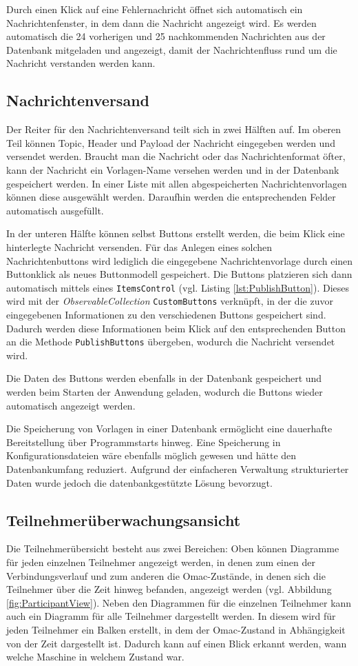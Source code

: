 Durch einen Klick auf eine Fehlernachricht öffnet sich automatisch ein Nachrichtenfenster, in dem dann die Nachricht angezeigt wird. Es werden automatisch die 24 vorherigen und 25 nachkommenden Nachrichten aus der Datenbank mitgeladen und angezeigt, damit der Nachrichtenfluss rund um die Nachricht verstanden werden kann.
\subsection{Nachrichtenversand}
Der Reiter für den Nachrichtenversand teilt sich in zwei Hälften auf. Im oberen Teil können Topic, Header und Payload der Nachricht eingegeben werden und versendet werden. Braucht man die Nachricht oder das Nachrichtenformat öfter, kann der Nachricht ein Vorlagen-Name versehen werden und in der Datenbank gespeichert werden. In einer Liste mit allen abgespeicherten Nachrichtenvorlagen können diese ausgewählt werden. Daraufhin werden die entsprechenden Felder automatisch ausgefüllt. 

In der unteren Hälfte können selbst Buttons erstellt werden, die beim Klick eine hinterlegte Nachricht versenden. Für das Anlegen eines solchen Nachrichtenbuttons wird lediglich die eingegebene Nachrichtenvorlage durch einen Buttonklick als neues Buttonmodell gespeichert. Die Buttons platzieren sich dann automatisch mittels eines \lstinline|ItemsControl| (vgl. Listing \ref{lst:PublishButton}). Dieses wird mit der \textit{ObservableCollection} \lstinline|CustomButtons| verknüpft, in der die zuvor eingegebenen Informationen zu den verschiedenen Buttons gespeichert sind. Dadurch werden diese Informationen beim Klick auf den entsprechenden Button an die Methode \lstinline|PublishButtons| übergeben, wodurch die Nachricht versendet wird.

Die Daten des Buttons werden ebenfalls in der Datenbank gespeichert und werden beim Starten der Anwendung geladen, wodurch die Buttons wieder automatisch angezeigt werden. 

Die Speicherung von Vorlagen in einer Datenbank ermöglicht eine dauerhafte Bereitstellung über Programmstarts hinweg. Eine Speicherung in Konfigurationsdateien wäre ebenfalls möglich gewesen und hätte den Datenbankumfang reduziert. Aufgrund der einfacheren Verwaltung strukturierter Daten wurde jedoch die datenbankgestützte Lösung bevorzugt.
\subsection{Teilnehmerüberwachungsansicht}
Die Teilnehmerübersicht besteht aus zwei Bereichen: Oben können Diagramme für jeden einzelnen Teilnehmer angezeigt werden, in denen zum einen der Verbindungsverlauf und zum anderen die Omac-Zustände, in denen sich die Teilnehmer über die Zeit hinweg befanden, angezeigt werden (vgl. Abbildung \ref{fig:ParticipantView}). Neben den Diagrammen für die einzelnen Teilnehmer kann auch ein Diagramm für alle Teilnehmer dargestellt werden. In diesem wird für jeden Teilnehmer ein Balken erstellt, in dem der Omac-Zustand in Abhängigkeit von der Zeit dargestellt ist. Dadurch kann auf einen Blick erkannt werden, wann welche Maschine in welchem Zustand war. 

